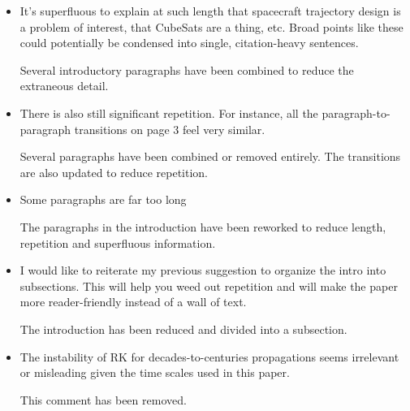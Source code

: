 \documentclass[11pt]{article}
\begin{document}
\begin{itemize}

    \item
        \begin{itshape}
            It's superfluous to explain at such length that spacecraft trajectory design is a problem of interest, that CubeSats are a thing, etc. Broad points like these could potentially be condensed into single, citation-heavy sentences. 
        \end{itshape}

        Several introductory paragraphs have been combined to reduce the extraneous detail.

    \item 
        \begin{itshape}
            There is also still significant repetition. For instance, all the paragraph-to-paragraph transitions on page 3 feel very similar.
        \end{itshape}

        Several paragraphs have been combined or removed entirely. 
        The transitions are also updated to reduce repetition.

    \item 
        \begin{itshape}
            Some paragraphs are far too long
        \end{itshape}

        The paragraphs in the introduction have been reworked to reduce length, repetition and superfluous information.

    \item 
        \begin{itshape}
            I would like to reiterate my previous suggestion to organize the intro into subsections.  This will help you weed out repetition and will make the paper more reader-friendly instead of a wall of text.
        \end{itshape}

        The introduction has been reduced and divided into a subsection.

    \item 
        \begin{itshape}
            The instability of RK for decades-to-centuries propagations seems irrelevant or misleading given the time scales used in this paper.
        \end{itshape}

        This comment has been removed.


\end{itemize}
\end{document}
